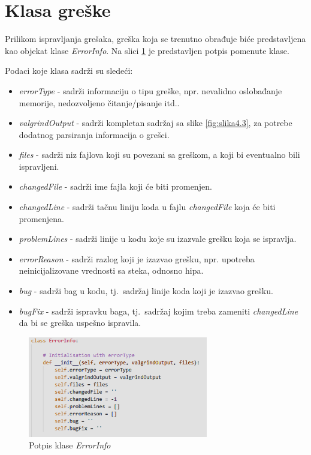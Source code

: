 \documentclass[12pt,oneside]{memoir}
\theoremstyle{plain}
\theoremstyle{definition}
\begin{document}
\section{Klasa greške}
Prilikom ispravljanja grešaka, greška koja se trenutno obrađuje biće predstavljena kao objekat klase \textit{ErrorInfo}. Na slici \ref{fig:slika4.1} je predstavljen potpis pomenute klase.

Podaci koje klasa sadrži su sledeći:
\begin{itemize}
\item \textit{errorType} - sadrži informaciju o tipu greške, npr. nevalidno oslobađanje memorije, nedozvoljeno čitanje/pisanje itd..
\item \textit{valgrindOutput} - sadrži kompletan sadržaj sa slike \ref{fig:slika4.3}, za potrebe dodatnog parsiranja informacija o grešci.
\item \textit{files} - sadrži niz fajlova koji su povezani sa greškom, a koji bi eventualno bili ispravljeni.
\item \textit{changedFile} - sadrži ime fajla koji će biti promenjen.
\item \textit{changedLine} - sadrži tačnu liniju koda u fajlu \textit{changedFile} koja će biti promenjena.
\item \textit{problemLines} - sadrži linije u kodu koje su izazvale grešku koja se ispravlja.
\item \textit{errorReason} - sadrži razlog koji je izazvao grešku, npr. upotreba neinicijalizovane vrednosti sa steka, odnosno hipa.
\item \textit{bug} - sadrži bag u kodu, tj.~sadržaj linije koda koji je izazvao grešku.
\item \textit{bugFix} - sadrži ispravku baga, tj.~sadržaj kojim treba zameniti \textit{changedLine} da bi se greška uspešno ispravila.
\end{itemize}

\begin{figure}[!ht]
  \centering
  \includegraphics[width=0.7\textwidth]{ErrorClass.png}
  \caption{Potpis klase \textit{ErrorInfo}}
  \label{fig:slika4.1}
\end{figure}
\end{document}
